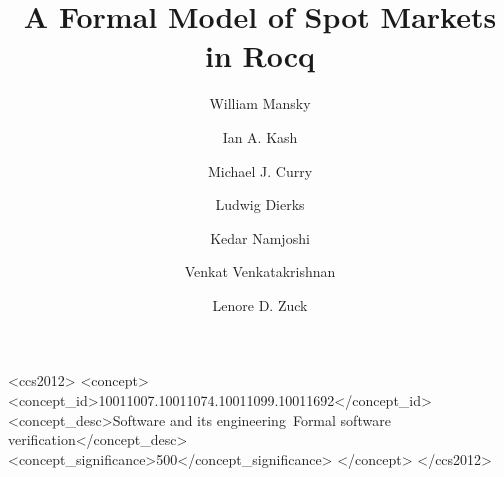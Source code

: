 \documentclass[acmsmall,review,screen]{acmart}
\begin{document}
\title{A Formal Model of Spot Markets in Rocq}

\author{William Mansky}

\author{Ian A. Kash}
\orcid{}

\author{Michael J. Curry}
\orcid{}

\author{Ludwig Dierks}
\orcid{}

\author{Kedar Namjoshi}
\orcid{}

\author{Venkat Venkatakrishnan}
\orcid{}

\author{Lenore D. Zuck}
\orcid{}

\begin{abstract}
\end{abstract}


\begin{CCSXML}
	<ccs2012>
	<concept>
	<concept_id>10011007.10011074.10011099.10011692</concept_id>
	<concept_desc>Software and its engineering~Formal software verification</concept_desc>
	<concept_significance>500</concept_significance>
	</concept>
	</ccs2012>
\end{CCSXML}
\end{document}
